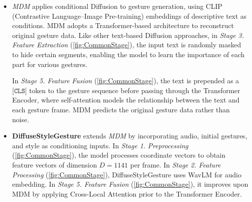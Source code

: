 \begin{itemize}
	\item \textit{MDM} \citep{tevet2022human} applies conditional Diffusion to gesture generation, using CLIP (Contrastive Language–Image Pre-training) embeddings of descriptive text as conditions. MDM adopts a Transformer-based architecture to reconstruct original gesture data. Like other text-based Diffusion approaches, in \textit{Stage 3. Feature Extraction} (\autoref{fig:CommonStage}), the input text is randomly masked to hide certain segments, enabling the model to learn the importance of each part for various gestures. 
	
	In \textit{Stage 5. Feature Fusion} (\autoref{fig:CommonStage}), the text is prepended as a $\texttt{[CLS]}$ token to the gesture sequence before passing through the Transformer Encoder, where self-attention models the relationship between the text and each gesture frame. MDM predicts the original gesture data rather than noise.
	
	\item \textbf{DiffuseStyleGesture} \citep{yang2023diffusestylegesture} extends \textit{MDM} \citep{tevet2022human} by incorporating audio, initial gestures, and style as conditioning inputs. In \textit{Stage 1. Preprocessing} (\autoref{fig:CommonStage}), the model processes coordinate vectors to obtain feature vectors of dimension $D=1141$ per frame. In \textit{Stage 2. Feature Processing} (\autoref{fig:CommonStage}), DiffuseStyleGesture uses WavLM for audio embedding. In \textit{Stage 5. Feature Fusion} (\autoref{fig:CommonStage}), it improves upon MDM by applying Cross-Local Attention prior to the Transformer Encoder.
\end{itemize}
%
%
%
